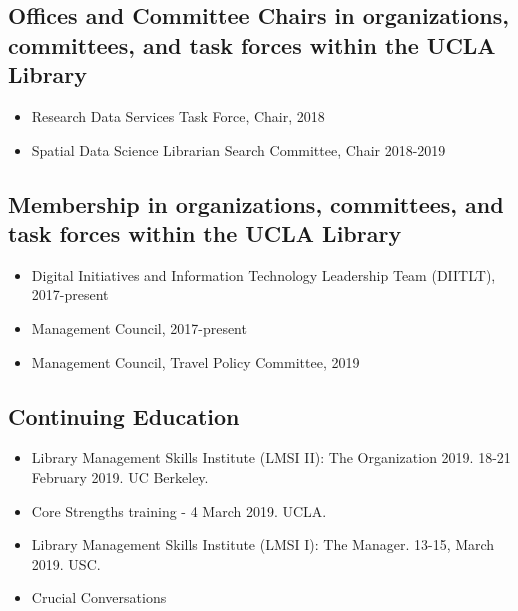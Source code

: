 
\subsection{Offices and Committee Chairs in organizations, committees, and task forces within the UCLA Library}

\begin{itemize}[label={}]
  \item Research Data Services Task Force, Chair, 2018
  \item Spatial Data Science Librarian Search Committee, Chair 2018-2019
\end{itemize}


\subsection{Membership in organizations, committees, and task forces within the UCLA Library}

\begin{itemize}[label={}]
    \item Digital Initiatives and Information Technology Leadership Team (DIITLT), 2017-present
    \item Management Council, 2017-present
    \item Management Council, Travel Policy Committee, 2019
\end{itemize}


\subsection{Continuing Education}


\begin{itemize}[label={}]
  \item Library Management Skills Institute (LMSI II): The Organization 2019. 18-21 February 2019. UC Berkeley.
  \item Core Strengths training - 4 March 2019. UCLA.
  \item Library Management Skills Institute (LMSI I): The Manager. 13-15, March 2019. USC.
  \item Crucial Conversations
\end{itemize}

